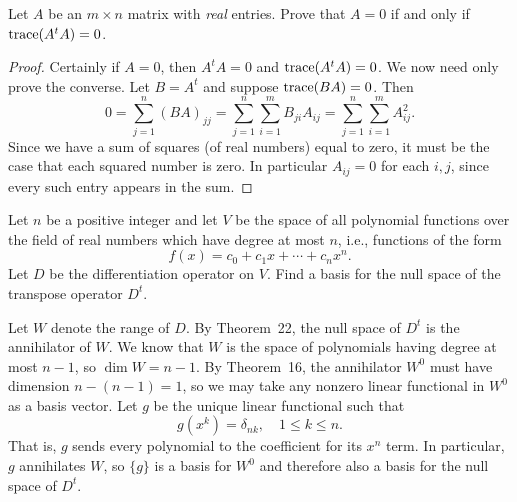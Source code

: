  Let $A$ be an $m\times n$ matrix with {\em real}
entries. Prove that $A = 0$ if and only if $\operatorname{trace}(A^tA) = 0$.
\begin{proof}
  Certainly if $A = 0$, then $A^tA = 0$ and $\operatorname{trace}(A^tA) = 0$. We now
  need only prove the converse. Let $B = A^t$ and suppose
  $\operatorname{trace}(BA) = 0$. Then
  \begin{equation*}
    0
    = \sum_{j=1}^n(BA)_{jj}
    = \sum_{j=1}^n\sum_{i=1}^mB_{ji}A_{ij}
    = \sum_{j=1}^n\sum_{i=1}^mA_{ij}^2.
  \end{equation*}
  Since we have a sum of squares (of real numbers) equal to zero, it
  must be the case that each squared number is zero. In particular
  $A_{ij} = 0$ for each $i,j$, since every such entry appears in the
  sum.
\end{proof}

 Let $n$ be a positive integer and let $V$ be the space of
all polynomial functions over the field of real numbers which have
degree at most $n$, i.e., functions of the form
\begin{equation*}
  f(x) = c_0 + c_1x + \cdots + c_nx^n.
\end{equation*}
Let $D$ be the differentiation operator on $V$. Find a basis for the
null space of the transpose operator $D^t$.
\begin{solution}
  Let $W$ denote the range of $D$. By Theorem~22, the null space of
  $D^t$ is the annihilator of $W$. We know that $W$ is the space of
  polynomials having degree at most $n - 1$, so $\dim W = n - 1$. By
  Theorem~16, the annihilator $W^0$ must have dimension
  $n - (n - 1) = 1$, so we may take any nonzero linear functional in
  $W^0$ as a basis vector. Let $g$ be the unique linear functional
  such that
  \begin{equation*}
    g(x^k) = \delta_{nk}, \quad 1\leq k\leq n.
  \end{equation*}
  That is, $g$ sends every polynomial to the coefficient for its $x^n$
  term. In particular, $g$ annihilates $W$, so $\{g\}$ is a basis for
  $W^0$ and therefore also a basis for the null space of $D^t$.
\end{solution}

